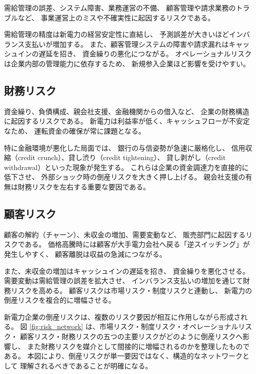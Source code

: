 需給管理の誤差、システム障害、業務運営の不備、
顧客管理や請求業務のトラブルなど、
事業運営上のミスや不確実性に起因するリスクである。

需給管理の精度は新電力の経営安定性に直結し、
予測誤差が大きいほどインバランス支払いが増加する。
また、顧客管理システムの障害や請求漏れはキャッシュインの遅延を招き、
資金繰りの悪化につながる。
オペレーショナルリスクは企業内部の管理能力に依存するため、
新規参入企業ほど影響を受けやすい。

\subsection{財務リスク}

資金繰り、負債構成、親会社支援、金融機関からの借入など、
企業の財務構造に起因するリスクである。
新電力は利益率が低く、キャッシュフローが不安定なため、
運転資金の確保が常に課題となる。

特に金融環境が悪化した局面では、
銀行の与信姿勢が急速に厳格化し、
信用収縮（credit crunch）、貸し渋り（credit tightening）、
貸し剥がし（credit withdrawal）といった現象が発生する。
これらは企業の資金調達力を直接的に低下させ、
外部ショック時の倒産リスクを大きく押し上げる。
親会社支援の有無は財務リスクを左右する重要な要因である。

\subsection{顧客リスク}

顧客の解約（チャーン）、未収金の増加、需要変動など、
販売部門に起因するリスクである。
価格高騰時には顧客が大手電力会社へ戻る「逆スイッチング」が発生しやすく、
顧客離脱は収益の急減につながる。

また、未収金の増加はキャッシュインの遅延を招き、
資金繰りを悪化させる。
需要変動は需給管理の誤差を拡大させ、
インバランス支払いの増加を通じて財務リスクを高める。
顧客リスクは市場リスク・制度リスクと連動し、
新電力の倒産リスクを複合的に増幅させる。

\vspace{1\baselineskip}
新電力企業の倒産リスクは、複数のリスク要因が相互に作用しながら形成される。
図 \ref{fig:risk_network} は、市場リスク・制度リスク・オペレーショナルリスク・
顧客リスク・財務リスクの五つの主要リスクがどのように倒産リスクへ影響し、
また財務リスクを媒介として間接的に増幅されるのかを整理したものである。
本図により、倒産リスクが単一要因ではなく、構造的なネットワークとして
理解されるべきであることが明確になる。

